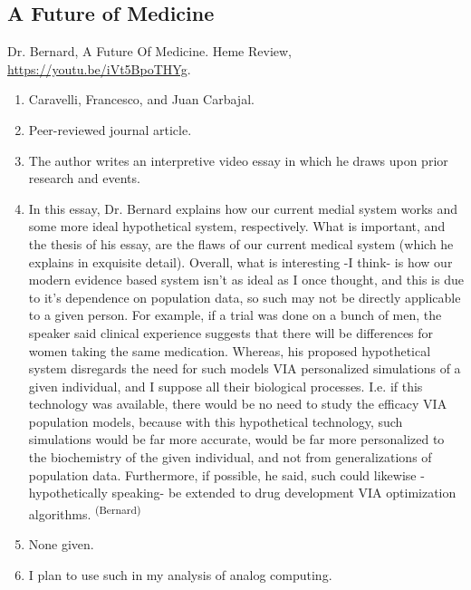 \subsection*{A Future of Medicine}
Dr. Bernard, A Future Of Medicine. Heme Review, \url{https://youtu.be/iVt5BpoTHYg}.
\begin{enumerate}
    \item Caravelli, Francesco, and Juan Carbajal.
    \item Peer-reviewed journal article.
    \item The author writes an interpretive video essay in which he draws upon prior research and events.
    \item In this essay, Dr. Bernard explains how our current medial system works and some more ideal hypothetical system, respectively. What is important, and the thesis of his essay, are the flaws of our current medical system (which he explains in exquisite detail). Overall, what is interesting -I think- is how our modern evidence based system isn’t as ideal as I once thought, and this is due to it’s dependence on population data, so such may not be directly applicable to a given person. For example, if a trial was done on a bunch of men, the speaker said clinical experience suggests that there will be differences for women taking the same medication. Whereas, his proposed hypothetical system disregards the need for such models VIA personalized simulations of a given individual, and I suppose all their biological processes. I.e. if this technology was available, there would be no need to study the efficacy VIA population models, because with this hypothetical technology, such simulations would be far more accurate, would be far more personalized to the biochemistry of the given individual, and not from generalizations of population data. Furthermore, if possible, he said, such could likewise -hypothetically speaking- be extended to drug development VIA optimization algorithms. \textsuperscript{(Bernard)}
    \item None given. 
    \item I plan to use such in my analysis of analog computing. 
\end{enumerate}


